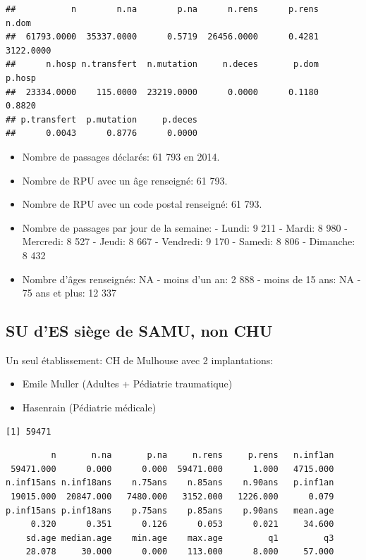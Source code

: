 \documentclass[]{article}
\begin{document}
\begin{verbatim}
##           n        n.na        p.na      n.rens      p.rens       n.dom 
##  61793.0000  35337.0000      0.5719  26456.0000      0.4281   3122.0000 
##      n.hosp n.transfert  n.mutation     n.deces       p.dom      p.hosp 
##  23334.0000    115.0000  23219.0000      0.0000      0.1180      0.8820 
## p.transfert  p.mutation     p.deces 
##      0.0043      0.8776      0.0000
\end{verbatim}

\begin{itemize}
\itemsep1pt\parskip0pt
\item
  Nombre de passages déclarés: 61 793 en 2014.
\item
  Nombre de RPU avec un âge renseigné: 61 793.
\item
  Nombre de RPU avec un code postal renseigné: 61 793.
\item
  Nombre de passages par jour de la semaine: - Lundi: 9 211 - Mardi: 8
  980 - Mercredi: 8 527 - Jeudi: 8 667 - Vendredi: 9 170 - Samedi: 8 806
  - Dimanche: 8 432
\item
  Nombre d'âges renseignés: NA - moins d'un an: 2 888 - moins de 15 ans:
  NA - 75 ans et plus: 12 337
\end{itemize}

\subsection{SU d'ES siège de SAMU, non
CHU}\label{su-des-siege-de-samu-non-chu}

Un seul établissement: CH de Mulhouse avec 2 implantations:

\begin{itemize}
\itemsep1pt\parskip0pt
\item
  Emile Muller (Adultes + Pédiatrie traumatique)
\item
  Hasenrain (Pédiatrie médicale)
\end{itemize}

\begin{verbatim}
[1] 59471
\end{verbatim}

\begin{verbatim}
         n       n.na       p.na     n.rens     p.rens   n.inf1an 
 59471.000      0.000      0.000  59471.000      1.000   4715.000 
n.inf15ans n.inf18ans    n.75ans    n.85ans    n.90ans   p.inf1an 
 19015.000  20847.000   7480.000   3152.000   1226.000      0.079 
p.inf15ans p.inf18ans    p.75ans    p.85ans    p.90ans   mean.age 
     0.320      0.351      0.126      0.053      0.021     34.600 
    sd.age median.age    min.age    max.age         q1         q3 
    28.078     30.000      0.000    113.000      8.000     57.000 
\end{verbatim}
\end{document}
